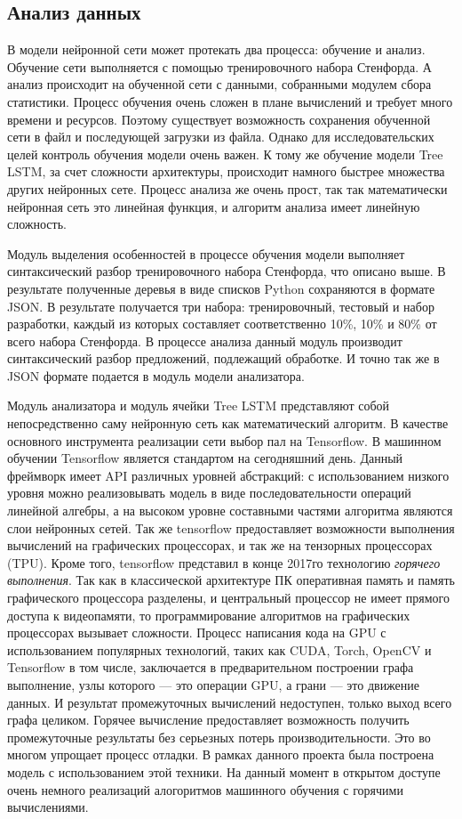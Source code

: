 \subsection{Анализ данных}\label{subsec:sys:data_analysis}
В модели нейронной сети может протекать два процесса: обучение и анализ. Обучение сети выполняется с помощью тренировочного набора Стенфорда. А анализ происходит на обученной сети с данными, собранными модулем сбора статистики. Процесс обучения очень сложен в плане вычислений и требует много времени и ресурсов. Поэтому существует возможность сохранения обученной сети в файл и последующей загрузки из файла. Однако для исследовательских целей контроль обучения модели очень важен. К тому же обучение модели Tree LSTM, за счет сложности архитектуры, происходит намного быстрее множества других нейронных сете. Процесс анализа же очень прост, так так математически нейронная сеть это линейная функция, и алгоритм анализа имеет линейную сложность.

Модуль выделения особенностей в процессе обучения модели выполняет синтаксический разбор тренировочного набора Стенфорда, что описано выше. В результате полученные деревья в виде списков Python сохраняются в формате JSON\@. В результате получается три набора: тренировочный, тестовый и набор разработки, каждый из которых составляет соответственно 10\%, 10\% и 80\% от всего набора Стенфорда. В процессе анализа данный модуль производит синтаксический разбор предложений, подлежащий обработке. И точно так же в JSON формате подается в модуль модели анализатора.

Модуль анализатора и модуль ячейки Tree LSTM представляют собой непосредственно саму нейронную сеть как математический алгоритм. В качестве основного инструмента реализации сети выбор пал на Tensorflow. В машинном обучении Tensorflow является стандартом на сегодняшний день. Данный фреймворк имеет API различных уровней абстракций: с использованием низкого уровня можно реализовывать модель в виде последовательности операций линейной алгебры, а на высоком уровне составными частями алгоритма являются слои нейронных сетей. Так же tensorflow предоставляет возможности выполнения вычислений на графических процессорах, и так же на тензорных процессорах (TPU).
Кроме того, tensorflow представил в конце 2017го технологию \textit{горячего выполнения}. Так как в классической архитектуре ПК оперативная память и память графического процессора разделены, и центральный процессор не имеет прямого доступа к видеопамяти, то программирование алгоритмов на графических процессорах вызывает сложности. Процесс написания кода на GPU с использованием популярных технологий, таких как CUDA, Torch, OpenCV и Tensorflow в том числе, заключается в предварительном построении графа выполнение, узлы которого --- это операции GPU, а грани --- это движение данных. И результат промежуточных вычислений недоступен, только выход всего графа целиком. Горячее вычисление предоставляет возможность получить промежуточные результаты без серьезных потерь производительности. Это во многом упрощает процесс отладки. В рамках данного проекта была построена модель с использованием этой техники. На данный момент в открытом доступе очень немного реализаций алогоритмов машинного обучения с горячими вычислениями.

